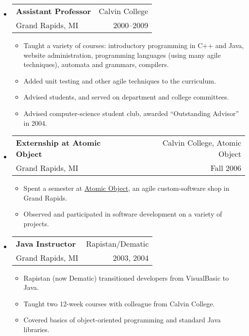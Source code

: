 \documentclass[letterpaper,10pt]{article}
\makeatletter
\newcommand{\resitem}[1]{\vspace{-2pt} \item #1}
\newcommand{\ressubheading}[4]{ 
\begin{tabular*}{7in}{l@{\extracolsep{\fill}}r}
	\textbf{#1} & #2 \\
	{#3} & {#4} \\
\end{tabular*}
\vspace{-6pt}}
\makeatother
\begin{document}
\begin{itemize}
	\item \ressubheading{Assistant Professor}{Calvin College}{Grand Rapids, MI}{2000--2009} 
    \vspace{-1mm}
	  \begin{itemize}
		\resitem{Taught a variety of courses: introductory programming in C++ and Java, website administration, programming languages (using many agile techniques), automata and grammars, compilers.}
		\resitem{Added unit testing and other agile techniques to the curriculum.}
	  \vspace{-1mm}
		\resitem{Advised students, and served on department and college committees.}
		\resitem{Advised computer-science student club, awarded ``Outstanding Advisor'' in 2004.}
	\end{itemize}
	
	\item \ressubheading{Externship at Atomic Object}{Calvin College, Atomic Object}{Grand Rapids, MI}{Fall 2006}
  \vspace{-1mm}
	  \begin{itemize}
	   \resitem{Spent a semester at \href{http://www.atomicobject.com}{Atomic Object}, an agile custom-software shop in Grand Rapids.}
	   \resitem{Observed and participated in software development on a variety of projects.}
	  \end{itemize}
	
	\item \ressubheading{Java Instructor}{Rapistan/Dematic}{Grand Rapids, MI}{2003, 2004}
  \vspace{-1mm}
	\begin{itemize}
	  \vspace{-1mm}
	  \resitem{Rapistan (now Dematic) transitioned developers from VisualBasic to Java.}
		\resitem{Taught two 12-week courses with colleague from Calvin College.}
		\resitem{Covered basics of object-oriented programming and standard Java libraries.}
	\end{itemize}
	

\end{itemize}
\end{document}
